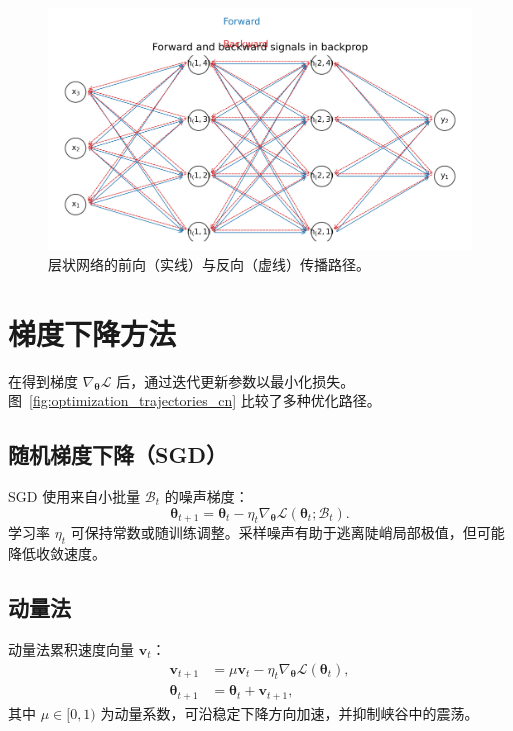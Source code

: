 ﻿\documentclass[UTF8,zihao=-4]{ctexart}
\begin{document}
\begin{figure}[H]
  \centering
  \includegraphics[width=0.8\linewidth]{backprop_computational_graph.png}
  \caption{层状网络的前向（实线）与反向（虚线）传播路径。}
  \label{fig:backprop_graph_cn}
\end{figure}
\FloatBarrier

\section{梯度下降方法}
在得到梯度 $\nabla_{\boldsymbol{\theta}} \mathcal{L}$ 后，通过迭代更新参数以最小化损失。图~\ref{fig:optimization_trajectories_cn} 比较了多种优化路径。

\subsection{随机梯度下降（SGD）}
SGD 使用来自小批量 $\mathcal{B}_t$ 的噪声梯度：
\begin{equation}
  \boldsymbol{\theta}_{t+1} = \boldsymbol{\theta}_t - \eta_t \nabla_{\boldsymbol{\theta}} \mathcal{L}(\boldsymbol{\theta}_t; \mathcal{B}_t).
\end{equation}
学习率 $\eta_t$ 可保持常数或随训练调整。采样噪声有助于逃离陡峭局部极值，但可能降低收敛速度。

\subsection{动量法}
动量法累积速度向量 $\mathbf{v}_t$：
\begin{align}
  \mathbf{v}_{t+1} &= \mu \mathbf{v}_t - \eta_t \nabla_{\boldsymbol{\theta}} \mathcal{L}(\boldsymbol{\theta}_t), \\
  \boldsymbol{\theta}_{t+1} &= \boldsymbol{\theta}_t + \mathbf{v}_{t+1},
\end{align}
其中 $\mu \in [0,1)$ 为动量系数，可沿稳定下降方向加速，并抑制峡谷中的震荡。
\end{document}

